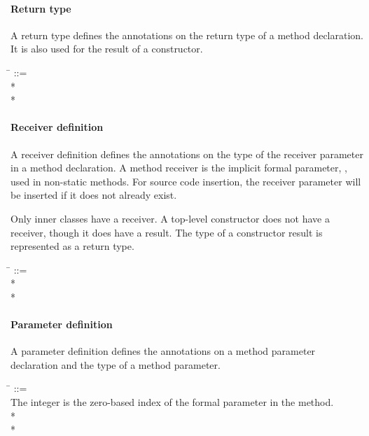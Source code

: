 \documentclass{article}
\newcommand{\code}[1]{\ifmmode{\mbox{\relax\ttfamily{#1}}}\else{\relax\ttfamily #1}\fi}
\begin{document}
\paragraph{Return type}

A return type defines the annotations on the return type of a method
declaration.  It is also used for the result of a constructor.

\begin{tabbing}
\qquad \= \kill
{} ::=  \\
\qquad    {} * \lineend \\
\qquad        {}*
\end{tabbing}


\paragraph{Receiver definition}

A receiver definition defines the annotations on the type of the receiver
parameter in a method declaration.  A method receiver is the implicit formal
parameter, \code{this}, used in non-static methods.  For source code insertion,
the receiver parameter will be inserted if it does not already exist.

Only inner classes have a receiver.  A top-level constructor does not have
a receiver, though it does have a result.  The type of a constructor result
is represented as a return type.

\begin{tabbing}
\qquad \= \kill
{} ::=  \\
\qquad    {} * \lineend \\
\qquad    {}*
\end{tabbing}


\paragraph{Parameter definition}

A parameter definition defines the annotations on a method parameter declaration
and the type of a method parameter.

\begin{tabbing}
\qquad \= \kill
{} ::= \\
\qquad    \bnfcmt The integer is the zero-based index of the formal parameter in the method. \\
\qquad    {}  \bnflit{:} * \lineend \\
\qquad    {}*
\end{tabbing}
\end{document}
